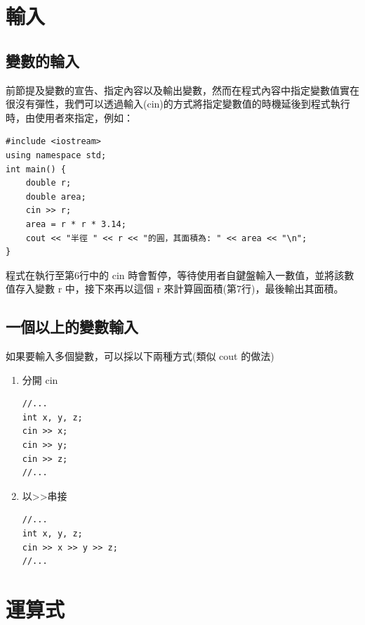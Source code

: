 \documentclass[a4paper,12pt]{article}
\begin{document}
\section{輸入}
\label{cpp_input}
\subsection{變數的輪入}
\label{sec:org55474ab}
前節提及變數的宣告、指定內容以及輸出變數，然而在程式內容中指定變數值實在很沒有彈性，我們可以透過輸入(cin)的方式將指定變數值的時機延後到程式執行時，由使用者來指定，例如：\\

\lstset{breaklines=true,language=cpp,label= ,caption= ,captionpos=b,firstnumber=1,numbers=left}
\begin{lstlisting}
#include <iostream>
using namespace std;
int main() {
    double r;
    double area;
    cin >> r;
    area = r * r * 3.14;
    cout << "半徑 " << r << "的圓，其面積為: " << area << "\n";
}
\end{lstlisting}

程式在執行至第6行中的 cin 時會暫停，等待使用者自鍵盤輸入一數值，並將該數值存入變數 r 中，接下來再以這個 r 來計算圓面積(第7行)，最後輸出其面積。\\

\subsection{一個以上的變數輸入}
\label{sec:org8702716}
如果要輸入多個變數，可以採以下兩種方式(類似 cout 的做法)\\
\begin{enumerate}
\item 分開 cin
\label{sec:orga8232a0}
\lstset{breaklines=true,language=cpp,label= ,caption= ,captionpos=b,firstnumber=1,numbers=left}
\begin{lstlisting}
//...
int x, y, z;
cin >> x;
cin >> y;
cin >> z;
//...
\end{lstlisting}

\item 以>>串接
\label{sec:orgb73e084}
\lstset{breaklines=true,language=cpp,label= ,caption= ,captionpos=b,firstnumber=1,numbers=left}
\begin{lstlisting}
//...
int x, y, z;
cin >> x >> y >> z;
//...
\end{lstlisting}
\end{enumerate}

\section{運算式}
\label{cpp_operation}
\end{document}
